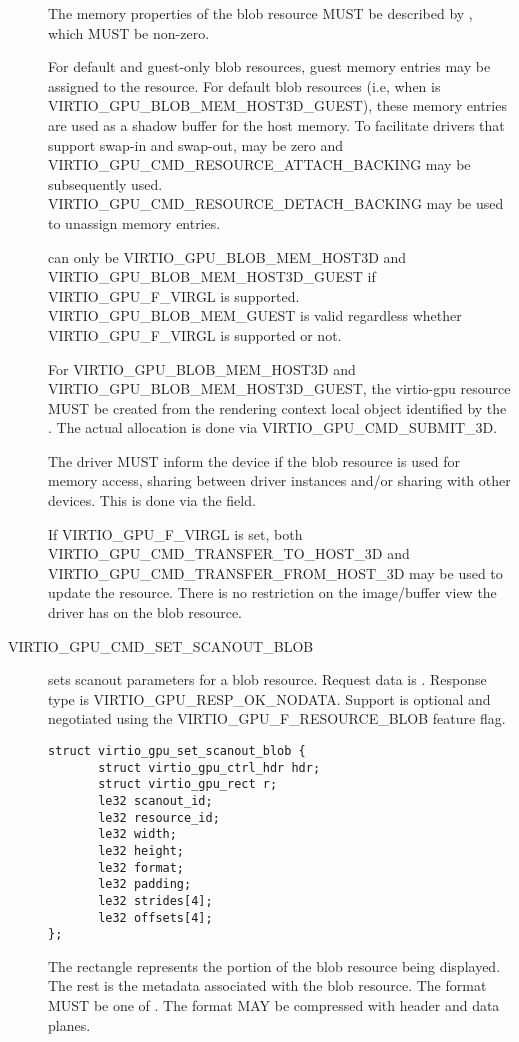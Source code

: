 \begin{description}
The memory properties of the blob resource MUST be described by
, which MUST be non-zero.

For default and guest-only blob resources,  guest
memory entries may be assigned to the resource.  For default blob resources
(i.e, when  is VIRTIO_GPU_BLOB_MEM_HOST3D_GUEST), these
memory entries are used as a shadow buffer for the host memory. To
facilitate drivers that support swap-in and swap-out,  may
be zero and VIRTIO_GPU_CMD_RESOURCE_ATTACH_BACKING may be subsequently used.
VIRTIO_GPU_CMD_RESOURCE_DETACH_BACKING may be used to unassign memory entries.

 can only be VIRTIO_GPU_BLOB_MEM_HOST3D and
VIRTIO_GPU_BLOB_MEM_HOST3D_GUEST if VIRTIO_GPU_F_VIRGL is supported.
VIRTIO_GPU_BLOB_MEM_GUEST is valid regardless whether VIRTIO_GPU_F_VIRGL
is supported or not.

For VIRTIO_GPU_BLOB_MEM_HOST3D and VIRTIO_GPU_BLOB_MEM_HOST3D_GUEST, the
virtio-gpu resource MUST be created from the rendering context local object
identified by the . The actual allocation is done via
VIRTIO_GPU_CMD_SUBMIT_3D.

The driver MUST inform the device if the blob resource is used for
memory access, sharing between driver instances and/or sharing with
other devices. This is done via the  field.

If VIRTIO_GPU_F_VIRGL is set, both VIRTIO_GPU_CMD_TRANSFER_TO_HOST_3D
and VIRTIO_GPU_CMD_TRANSFER_FROM_HOST_3D may be used to update the
resource. There is no restriction on the image/buffer view the driver
has on the blob resource.

\item[VIRTIO_GPU_CMD_SET_SCANOUT_BLOB] sets scanout parameters for a
   blob resource. Request data is
  . Response type is
  VIRTIO_GPU_RESP_OK_NODATA. Support is optional and negotiated
  using the VIRTIO_GPU_F_RESOURCE_BLOB feature flag.

\begin{lstlisting}
struct virtio_gpu_set_scanout_blob {
       struct virtio_gpu_ctrl_hdr hdr;
       struct virtio_gpu_rect r;
       le32 scanout_id;
       le32 resource_id;
       le32 width;
       le32 height;
       le32 format;
       le32 padding;
       le32 strides[4];
       le32 offsets[4];
};
\end{lstlisting}

The rectangle  represents the portion of the blob resource being
displayed. The rest is the metadata associated with the blob resource. The
format MUST be one of .  The format MAY be
compressed with header and data planes.

\end{description}

